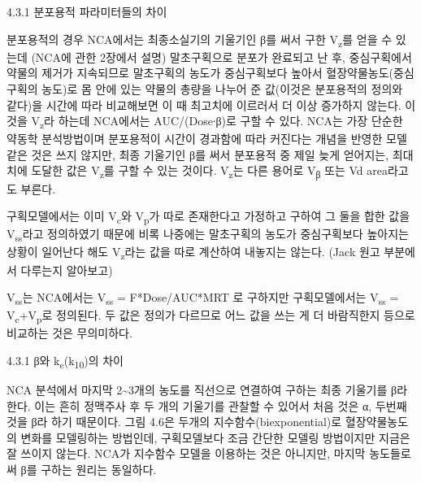 \documentclass[
  11pt,
  krantz2, a4paper, twoside]{krantz}
\begin{document}
4.3.1 분포용적 파라미터들의 차이

분포용적의 경우 NCA에서는 최종소실기의 기울기인 β를 써서 구한 V\textsubscript{z}를
얻을 수 있는데 (NCA에 관한 2장에서 설명) 말초구획으로 분포가 완료되고 난
후, 중심구획에서 약물의 제거가 지속되므로 말초구획의 농도가 중심구획보다
높아서 혈장약물농도(중심구획의 농도)로 몸 안에 있는 약물의 총량을 나누어
준 값(이것은 분포용적의 정의와 같다)을 시간에 따라 비교해보면 이 때
최고치에 이르러서 더 이상 증가하지 않는다. 이것을 V\textsubscript{z}라 하는데
NCA에서는 AUC/(Dose∙β)로 구할 수 있다. NCA는 가장 단순한 약동학
분석방법이며 분포용적이 시간이 경과함에 따라 커진다는 개념을 반영한 모델
같은 것은 쓰지 않지만, 최종 기울기인 β를 써서 분포용적 중 제일 늦게
얻어지는, 최대치에 도달한 값은 V\textsubscript{z}를 구할 수 있는 것이다. V\textsubscript{z}는 다른
용어로 V\textsubscript{β} 또는 Vd area라고도 부른다.

구획모델에서는 이미 V\textsubscript{c}와 V\textsubscript{p}가 따로 존재한다고 가정하고 구하여 그
둘을 합한 값을 V\textsubscript{ss}라고 정의하였기 때문에 비록 나중에는 말초구획의
농도가 중심구획보다 높아지는 상황이 일어난다 해도 V\textsubscript{z}라는 값을 따로
계산하여 내놓지는 않는다. (Jack 원고 부분에서 다루는지 알아보고)

V\textsubscript{ss}는 NCA에서는 V\textsubscript{ss} = F*Dose/AUC*MRT 로 구하지만 구획모델에서는
V\textsubscript{ss} = V\textsubscript{c}+V\textsubscript{p}로 정의된다. 두 값은 정의가 다르므로 어느 값을 쓰는 게
더 바람직한지 등으로 비교하는 것은 무의미하다.

4.3.1 β와 k\textsubscript{e}(k\textsubscript{10})의 차이

NCA 분석에서 마지막 2\textasciitilde3개의 농도를 직선으로 연결하여 구하는 최종
기울기를 β라 한다. 이는 흔히 정맥주사 후 두 개의 기울기를 관찰할 수
있어서 처음 것은 α, 두번째 것을 β라 하기 때문이다. 그림 4.6은 두개의
지수함수(biexponential)로 혈장약물농도의 변화를 모델링하는 방법인데,
구획모델보다 조금 간단한 모델링 방법이지만 지금은 잘 쓰이지 않는다.
NCA가 지수함수 모델을 이용하는 것은 아니지만, 마지막 농도들로써 β를
구하는 원리는 동일하다.
\end{document}
